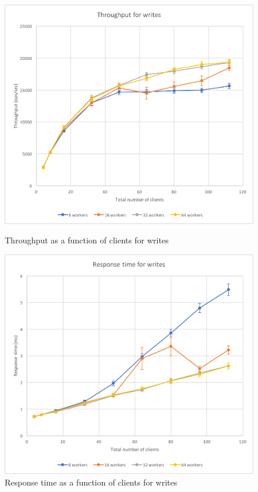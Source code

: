 \documentclass[11pt,a4paper]{article}
\begin{document}
\begin{figure}[!h]
    \centering
    \begin{minipage}[b]{.45\textwidth}
        \centering
        \includegraphics[width=\textwidth]{processing/graphics/bench_2mw_through-clients_writes.png}
        \caption{Throughput as a function of clients for writes}
        \label{png::bench_2mw_through-clients_writes}
    \end{minipage}
    \qquad
    \begin{minipage}[b]{.45\textwidth}
        \centering
        \includegraphics[width=\textwidth]{processing/graphics/bench_2mw_latency-clients_writes.png}
        \caption{Response time as a function of clients for writes}
        \label{png::bench_2mw_latency-clients_writes}
    \end{minipage}
\end{figure}
\end{document}
